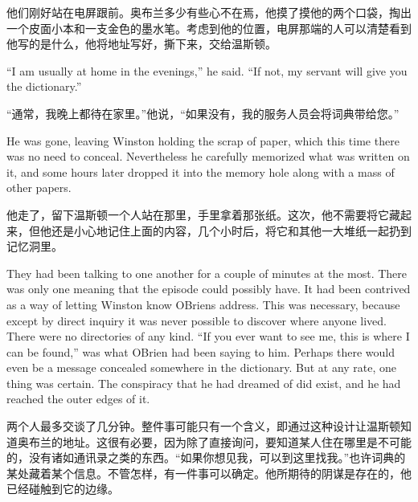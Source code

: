 \begin{paracol}{2}
\switchcolumn

他们刚好站在电屏跟前。奥布兰多少有些心不在焉，他摸了摸他的两个口袋，掏出一个皮面小本和一支金色的墨水笔。考虑到他的位置，电屏那端的人可以清楚看到他写的是什么，他将地址写好，撕下来，交给温斯顿。

\switchcolumn*

``I am usually at home in the evenings,'' he said. ``If not, my servant
will give you the dictionary.''

\switchcolumn

``通常，我晚上都待在家里。''他说，``如果没有，我的服务人员会将词典带给您。''

\switchcolumn*

He was gone, leaving Winston holding the scrap of paper, which this time
there was no need to conceal. Nevertheless he carefully memorized what
was written on it, and some hours later dropped it into the memory hole
along with a mass of other papers.

\switchcolumn

他走了，留下温斯顿一个人站在那里，手里拿着那张纸。这次，他不需要将它藏起来，但他还是小心地记住上面的内容，几个小时后，将它和其他一大堆纸一起扔到记忆洞里。

\switchcolumn*

They had been talking to one another for a couple of minutes at the
most. There was only one meaning that the episode could possibly have.
It had been contrived as a way of letting Winston know
O\textquotesingle Brien\textquotesingle s address. This was necessary,
because except by direct inquiry it was never possible to discover where
anyone lived. There were no directories of any kind. ``If you ever want
to see me, this is where I can be found,'' was what
O\textquotesingle Brien had been saying to him. Perhaps there would even
be a message concealed somewhere in the dictionary. But at any rate, one
thing was certain. The conspiracy that he had dreamed of did exist, and
he had reached the outer edges of it.

\switchcolumn

两个人最多交谈了几分钟。整件事可能只有一个含义，即通过这种设计让温斯顿知道奥布兰的地址。这很有必要，因为除了直接询问，要知道某人住在哪里是不可能的，没有诸如通讯录之类的东西。``如果你想见我，可以到这里找我。''也许词典的某处藏着某个信息。不管怎样，有一件事可以确定。他所期待的阴谋是存在的，他已经碰触到它的边缘。

\switchcolumn*


\end{paracol}
